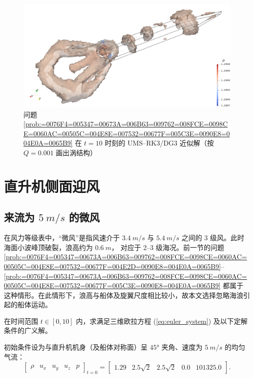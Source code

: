 \begin{figure}[h!]
\begin{centering}
\includegraphics[width=1\textwidth,height=0.28\textheight,keepaspectratio]{figures/ship/x=0/Frame100_Q}
\par\end{centering}
\caption{\label{fig:ship_x=00003D0_a=00003D0_t=00003D10_Q}问题 \ref{prob:=0076F4=005347=00673A=006B63=009762=008FCE=0098CE=0060AC=00505C=004E8E=007532=00677F=005C3E=0090E8=004E0A=0065B9}
在 $t=10$ 时刻的 UMS–RK3/DG3 近似解（按 $Q=0.001$ 画出涡结构）}
\end{figure}

\newpage{}

\section{直升机侧面迎风}

\subsection{来流为 $\SI{5}{m/s}$ 的微风}

在风力等级表中，“微风”是指风速介于 $\SI{3.4}{m/s}$ 与 $\SI{5.4}{m/s}$ 之间的 3 级风。此时海面小波峰顶破裂，浪高约为
$\SI{0.6}{m}$， 对应于 2–3 级海况。前一节的问题 \ref{prob:=0076F4=005347=00673A=006B63=009762=008FCE=0098CE=0060AC=00505C=004E8E=007532=00677F=004E2D=0090E8=004E0A=0065B9}–\ref{prob:=0076F4=005347=00673A=006B63=009762=008FCE=0098CE=0060AC=00505C=004E8E=007532=00677F=005C3E=0090E8=004E0A=0065B9}
都属于这种情形。在此情形下，浪高与船体及旋翼尺度相比较小，故本文选择忽略海浪引起的船体运动。
\begin{problem}
[直升机侧面迎微风悬停于甲板中部上方]\label{prob:=0076F4=005347=00673A=004FA7=009762=008FCE=005FAE=0098CE=0060AC=00505C=004E8E=007532=00677F=004E2D=0090E8=004E0A=0065B9}在时间范围
$t\in[0,10]$ 内，求满足三维欧拉方程 (\ref{eq:euler_system}) 及以下定解条件的广义解。

初始条件设为与直升机机身（及船体对称面）呈 $\ang{45}$ 夹角、速度为 $\SI{5}{m/s}$ 的均匀气流：
\begin{equation}
\begin{bmatrix}\rho & u_{x} & u_{y} & u_{z} & p\end{bmatrix}_{t=0}=\begin{bmatrix}1.29 & 2.5\sqrt{2} & 2.5\sqrt{2} & 0.0 & 101325.0\end{bmatrix}.
\end{equation}
\end{problem}

